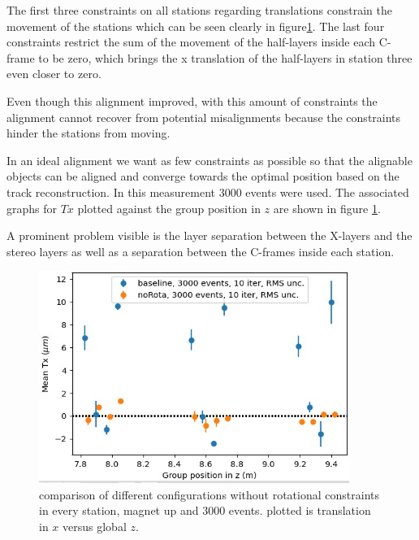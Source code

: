 The first three constraints on all stations regarding translations constrain the movement of the stations which can be seen clearly in figure\ref{fig:june_2}. The last four constraints restrict the sum of the movement of the half-layers inside each C-frame to be zero, which brings the x translation of the half-layers in station three even closer to zero.

Even though this alignment improved, with this amount of constraints the alignment cannot recover from potential misalignments because the constraints hinder the stations from moving.

In an ideal alignment we want as few constraints as possible so that the alignable objects can be aligned and converge towards the optimal position based on the track reconstruction.
In this measurement 3000 events were used. The associated graphs for $Tx$ plotted against the group position in $z$ are shown in figure \ref{fig:june_2}.

A prominent problem visible is the layer separation between the X-layers and the stereo layers as well as a separation between the C-frames inside each station.

\begin{figure}
  \centering
  \includegraphics[width=0.9\textwidth]{plots/renewed_plots/lxplus/4_3.jpeg}
  \caption{comparison of different configurations without rotational constraints in every station, magnet up and 3000 events. plotted is translation in $x$ versus global $z$.}
  \label{fig:june_2}
\end{figure}


